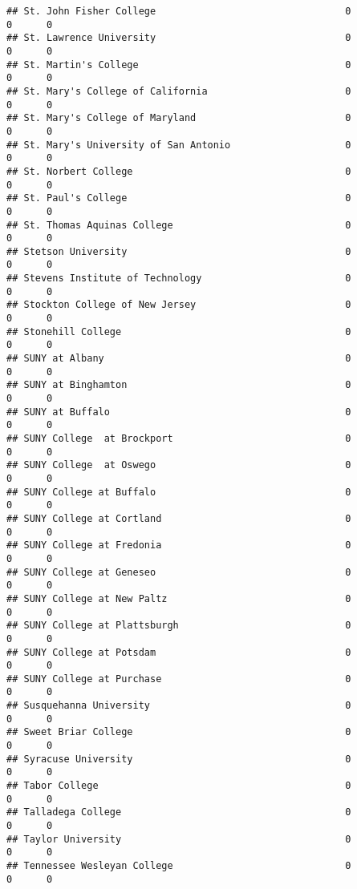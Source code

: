 \documentclass[
]{article}
\begin{document}
\begin{verbatim}
## St. John Fisher College                                 0          0      0
## St. Lawrence University                                 0          0      0
## St. Martin's College                                    0          0      0
## St. Mary's College of California                        0          0      0
## St. Mary's College of Maryland                          0          0      0
## St. Mary's University of San Antonio                    0          0      0
## St. Norbert College                                     0          0      0
## St. Paul's College                                      0          0      0
## St. Thomas Aquinas College                              0          0      0
## Stetson University                                      0          0      0
## Stevens Institute of Technology                         0          0      0
## Stockton College of New Jersey                          0          0      0
## Stonehill College                                       0          0      0
## SUNY at Albany                                          0          0      0
## SUNY at Binghamton                                      0          0      0
## SUNY at Buffalo                                         0          0      0
## SUNY College  at Brockport                              0          0      0
## SUNY College  at Oswego                                 0          0      0
## SUNY College at Buffalo                                 0          0      0
## SUNY College at Cortland                                0          0      0
## SUNY College at Fredonia                                0          0      0
## SUNY College at Geneseo                                 0          0      0
## SUNY College at New Paltz                               0          0      0
## SUNY College at Plattsburgh                             0          0      0
## SUNY College at Potsdam                                 0          0      0
## SUNY College at Purchase                                0          0      0
## Susquehanna University                                  0          0      0
## Sweet Briar College                                     0          0      0
## Syracuse University                                     0          0      0
## Tabor College                                           0          0      0
## Talladega College                                       0          0      0
## Taylor University                                       0          0      0
## Tennessee Wesleyan College                              0          0      0

\end{verbatim}
\end{document}

